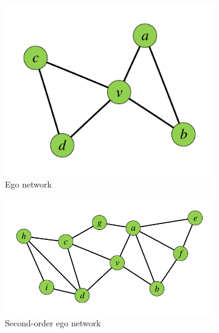 \begin{figure}[t!]
        \begin{subfigure}[b]{0.38\textwidth}
                \includegraphics[width=\textwidth]{./images/ego2.pdf}
                \caption{Ego network}
                \label{fig:1-b}
        \end{subfigure}
        \begin{subfigure}[b]{0.60\textwidth}
                \includegraphics[width=\textwidth]{./images/second-order.pdf}
                \caption{Second-order ego network}
                \label{fig:1-c}
        \end{subfigure}
        \begin{subfigure}[b]{0.38\textwidth}

\end{subfigure}
\end{figure}
